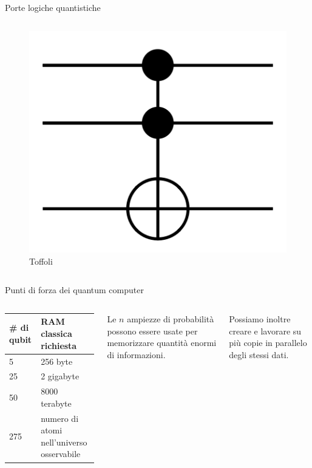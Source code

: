 \documentclass{beamer}
\begin{document}
\begin{frame}{Porte logiche quantistiche}
\begin{columns}
\begin{figure}[]
                \includegraphics[width=\textwidth]{gfx/Toffoli_gate}                
                \caption{Toffoli}
                \label{}
            \end{figure}
        \end{columns}
    \end{frame}

    \begin{frame}{Punti di forza dei quantum computer}
        \begin{columns}
            \begin{tabular}{p{}p{}}
                \# di qubit & RAM classica richiesta \\ \hline
                5 & 256 byte \\ 
                25 & 2 gigabyte \\ 
                50 & 8000 terabyte \\ 
                275 & numero di atomi nell'universo osservabile 
            \end{tabular}
            Le $n$ ampiezze di probabilità possono essere usate per memorizzare quantità enormi di informazioni. 

            Possiamo inoltre creare e lavorare su più copie in parallelo degli stessi dati. 
        \end{columns}
    \end{frame}
\end{document}
